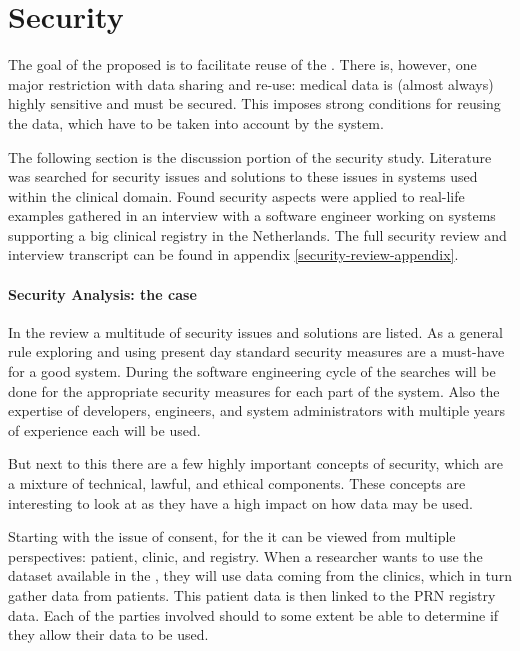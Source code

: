 \section{Security}
\label{security}

The goal of the proposed \ivfsystem{} is to facilitate reuse of the \projectdata{}.
There is, however, one major restriction with data sharing and re-use: medical data is (almost always) highly sensitive and must be secured. 
This imposes strong conditions for reusing the data, which have to be taken into account by the system.

The following section is the discussion portion of the security study.
Literature was searched for security issues and solutions to these issues in systems used within the clinical domain.
Found security aspects were applied to real-life examples gathered in an interview with a software engineer working on systems supporting a big clinical registry in the Netherlands.
The full security review and interview transcript can be found in appendix \ref{security-review-appendix}.

\paragraph{Security Analysis: the \ivfsystem{} case}
\label{security-summarisation-analysis}

In the review a multitude of security issues and solutions are listed.
As a general rule exploring and using present day standard security measures are a must-have for a good system.
During the software engineering cycle of the \ivfsystem{} searches will be done for the appropriate security measures for each part of the system.
Also the expertise of developers, engineers, and system administrators with multiple years of experience each will be used.

But next to this there are a few highly important concepts of security, which are a mixture of technical, lawful, and ethical components.
These concepts are interesting to look at as they have a high impact on how data may be used.

Starting with the issue of consent, for the \project{} it can be viewed from multiple perspectives: patient, clinic, and registry.
When a researcher wants to use the dataset available in the \ivfsystem{}, they will use data coming from the clinics, which in turn gather data from patients.
This patient data is then linked to the PRN registry data.
Each of the parties involved should to some extent be able to determine if they allow their data to be used.

